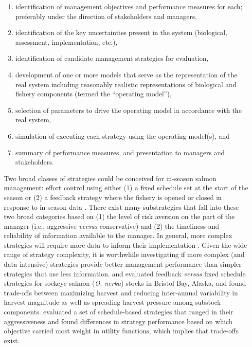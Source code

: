 \documentclass[12pt,]{book}
\theoremstyle{definition}
\theoremstyle{definition}
\theoremstyle{definition}
\theoremstyle{remark}
\begin{document}
\begin{enumerate}
\def\labelenumi{(\arabic{enumi})}
\item
  identification of management objectives and performance measures for
  each; preferably under the direction of stakeholders and managers,
\item
  identification of the key uncertainties present in the system
  (biological, assessment, implementation, etc.),
\item
  identification of candidate management strategies for evaluation,
\item
  development of one or more models that serve as the representation of
  the real system including reasonably realistic representations of
  biological and fishery components (termed the ``operating model''),
\item
  selection of parameters to drive the operating model in accordance
  with the real system,
\item
  simulation of executing each strategy using the operating model(s),
  and
\item
  summary of performance measures, and presentation to managers and
  stakeholders.
\end{enumerate}

Two broad classes of strategies could be conceived for in-season salmon
management: effort control using either (1) a fixed schedule set at the
start of the season or (2) a feedback strategy where the fishery is
opened or closed in response to in-season data \citep[i.e., management
by emergency order,][]{adkison-cunningham-2015}. There exist many
substrategies that fall into these two broad categories based on (1) the
level of risk aversion on the part of the manager (i.e., aggressive
\emph{versus} conservative) and (2) the timeliness and reliability of
information available to the manager. In general, more complex
strategies will require more data to inform their implementation
\citep{carney-adkison-2014b}. Given the wide range of strategy
complexity, it is worthwhile investigating if more complex (and
data-intensive) strategies provide better management performance than
simpler strategies that use less information.
\citet{carney-adkison-2014a} and \citet{carney-adkison-2014b} evaluated
feedback \emph{versus} fixed schedule strategies for sockeye salmon
(\emph{O. nerka}) stocks in Bristol Bay, Alaska, and found trade-offs
between maximizing harvest and reducing inter-annual variability in
harvest magnitude as well as spreading harvest pressure among substock
components. \citet{su-adkison-2002} evaluated a set of schedule-based
strategies that ranged in their aggressiveness and found differences in
strategy performance based on which objective carried most weight in
utility functions, which implies that trade-offs exist.
\end{document}
